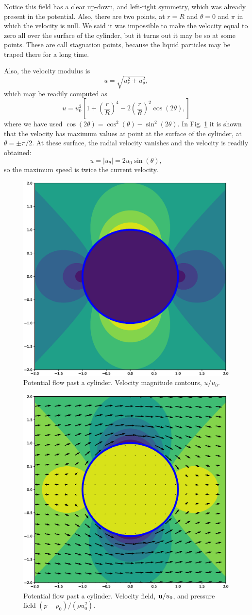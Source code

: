 Notice this field has a clear up-down, and left-right symmetry, which
was already present in the potential. Also, there are two points, at
$r=R$ and $\theta=0$ and $\pi$ in which the velocity is null. We said
it was impossible to make the velocity equal to zero all over the
surface of the cylinder, but it turns out it may be so at some
points. These are call stagnation points, because the liquid particles
may be traped there for a long time.

Also, the velocity modulus is
\[
u = \sqrt{ u_r^2 + u_\theta^2}  ,
\]
which may be readily computed as
\begin{equation*}
u = u_0^2 
\left[
 1 + \left( \frac{r}{R}\right)^4 -
 2 \left( \frac{r}{R}\right)^2 \cos(2\theta) ,
\right]
\end{equation*}
where we have used $\cos(2\theta) =\cos^2(\theta)  - \sin^2(2\theta) $. In
Fig. \ref{fig:potential_flow_past_cylinder_vel}  it is shown
that the velocity has maximum values at point at the surface of the
cylinder, at $\theta=\pm \pi/2$. At these surface, the radial velocity
vanishes and the velocity is readily obtained:
\[
u = |u_\theta| = 2 u_0  \sin(\theta) ,
\]
so the maximum speed is twice the current velocity.


\begin{figure}
  \centering
  \includegraphics[width=0.4\linewidth]{figures/potential_flow_past_cylinder_vel}
  \caption{
  	Potential flow past a cylinder. Velocity magnitude contours, $u/u_0$.
  	\label{fig:potential_flow_past_cylinder_vel}}
\end{figure}


\begin{figure}
  \centering
  \includegraphics[width=0.4\linewidth]{figures/potential_flow_past_cylinder_vel_p}
  \caption{	Potential flow past a cylinder. Velocity field, $\mathbf{u}/u_0$, and pressure field $ (p-p_0)/(\rho u_0^2)$. \label{fig:potential_flow_past_cylinder_vel_p}}
\end{figure}


